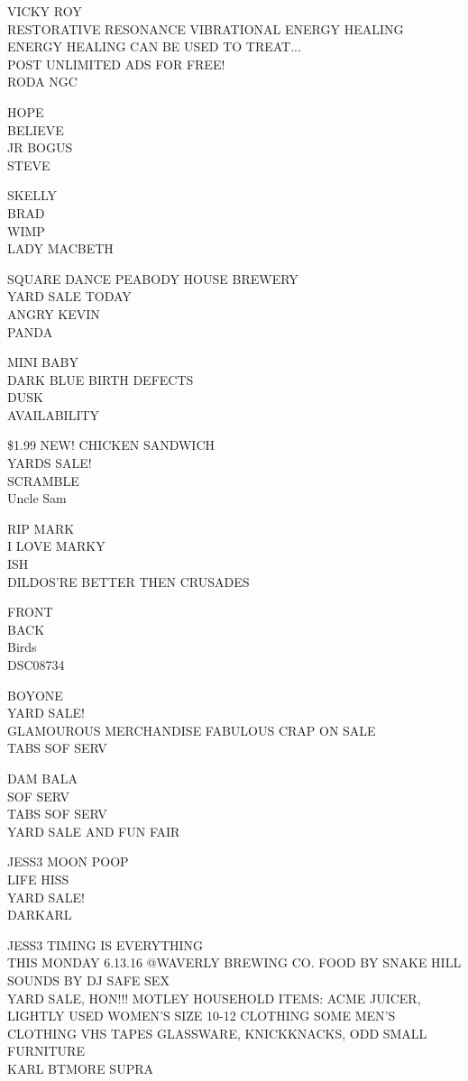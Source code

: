 \documentclass[10pt,letterpaper]{article}
\begin{document}
VICKY ROY\\
RESTORATIVE RESONANCE VIBRATIONAL ENERGY HEALING ENERGY HEALING CAN BE USED TO TREAT...\\
POST UNLIMITED ADS FOR FREE!\\
RODA NGC

HOPE\\
BELIEVE\\
JR BOGUS\\
STEVE

SKELLY\\
BRAD\\
WIMP\\
LADY MACBETH

SQUARE DANCE PEABODY HOUSE BREWERY\\
YARD SALE TODAY\\
ANGRY KEVIN\\
PANDA

MINI BABY\\
DARK BLUE BIRTH DEFECTS\\
DUSK\\
AVAILABILITY

\$1.99 NEW!  CHICKEN SANDWICH\\
YARDS SALE!\\
SCRAMBLE\\
Uncle Sam

RIP MARK\\
I LOVE MARKY\\
ISH\\
DILDOS'RE BETTER THEN CRUSADES

FRONT\\
BACK\\
Birds\\
DSC08734

BOYONE\\
YARD SALE!\\
GLAMOUROUS MERCHANDISE FABULOUS CRAP ON SALE\\
TABS SOF SERV

DAM BALA\\
SOF SERV\\
TABS SOF SERV\\
YARD SALE AND FUN FAIR

JESS3 MOON POOP\\
LIFE HISS\\
YARD SALE!\\
DARKARL

JESS3 TIMING IS EVERYTHING\\
THIS MONDAY 6.13.16 @WAVERLY BREWING CO. FOOD BY SNAKE HILL SOUNDS BY DJ SAFE SEX\\
YARD SALE, HON!!! MOTLEY HOUSEHOLD ITEMS: ACME JUICER, LIGHTLY USED WOMEN'S SIZE 10{-}12 CLOTHING SOME MEN'S CLOTHING VHS TAPES GLASSWARE, KNICKKNACKS, ODD SMALL FURNITURE\\
KARL BTMORE SUPRA
\end{document}
